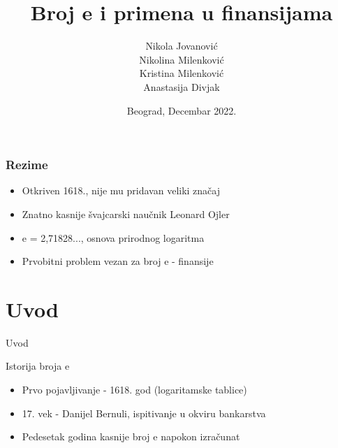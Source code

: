 \documentclass[xcolor=dvipsnames]{beamer}
\title{Broj e i primena u finansijama}
\author[Jovanović, Milenković, Milenković, Divjak]{Nikola Jovanović \\ Nikolina Milenković \\  Kristina Milenković \\ Anastasija Divjak}
\institute{Univerzitet u Beogradu, Matematički fakultet}
\date{Beograd, Decembar 2022.}
\begin{document}
\begin{frame}
  \titlepage
\end{frame}

\begin{frame}
\frametitle{Rezime}
\begin{itemize}
 \item Otkriven 1618., nije mu pridavan veliki značaj
 \item Znatno kasnije švajcarski naučnik Leonard Ojler
 \item e = 2,71828..., osnova prirodnog logaritma
 \item Prvobitni problem vezan za broj e - finansije
\end{itemize}
\end{frame}

\section{Uvod}
\begin{frame}{Uvod}
\begin{block}{Istorija broja e}
    \begin{itemize}
        \item Prvo pojavljivanje - 1618. god (logaritamske tablice)
        \item 17. vek - Danijel Bernuli, ispitivanje u okviru bankarstva
        \item Pedesetak godina kasnije broj e napokon izračunat
    \end{itemize}
\end{block}
\end{frame}
\end{document}
